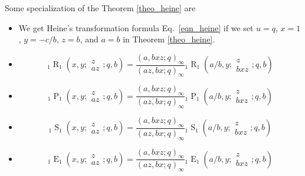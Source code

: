\documentclass{cimart}
\DeclareMathOperator{\opE}{E}
\DeclareMathOperator{\opP}{P}
\DeclareMathOperator{\opR}{R}
\DeclareMathOperator{\opS}{S}
\begin{document}
Some specialization of the Theorem \ref{theo_heine} are
\begin{itemize}
    \item 
    We get Heine's transformation formula Eq.~\eqref{eqn_heine} if we set $u=q$, $x=1$, $y=-c/b$, $z=b$, and $a=b$ in Theorem \ref{theo_heine}.
    \item 
    \begin{equation*}
        {}_{1}\opR_{1}\left(x,y;
        \begin{array}{c}
             z \\
             az
        \end{array};
        q,b
        \right)=\frac{(a,bxz;q)_{\infty}}{(az,bx;q)_{\infty}}{}_{1}\opR_{1}\left(a/b,y;
        \begin{array}{c}
             z \\
             bxz
        \end{array};
        q,b
        \right)
    \end{equation*}
    \item 
    \begin{equation*}
        {}_{1}\opP_{1}\left(x,y;
        \begin{array}{c}
             z \\
             az
        \end{array};
        q,b
        \right)=\frac{(a,bxz;q)_{\infty}}{(az,bx;q)_{\infty}}{}_{1}\opP_{1}\left(a/b,y;
        \begin{array}{c}
             z \\
             bxz
        \end{array};
        q,b
        \right)
    \end{equation*}
    \item 
    \begin{equation*}
        {}_{1}\opS_{1}\left(x,y;
        \begin{array}{c}
             z \\
             az
        \end{array};
        q,b
        \right)=\frac{(a,bxz;q)_{\infty}}{(az,bx;q)_{\infty}}{}_{1}\opS_{1}\left(a/b,y;
        \begin{array}{c}
             z \\
             bxz
        \end{array};
        q,b
        \right)
    \end{equation*}
    \item 
    \begin{equation*}
        {}_{1}\opE_{1}\left(x,y;
        \begin{array}{c}
             z \\
             az
        \end{array};
        q,b
        \right)=\frac{(a,bxz;q)_{\infty}}{(az,bx;q)_{\infty}}{}_{1}\opE_{1}\left(a/b,y;
        \begin{array}{c}
             z \\
             bxz
        \end{array};
        q,b
        \right)
    \end{equation*}
\end{itemize}
\end{document}
